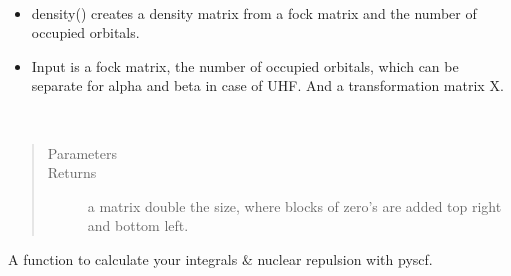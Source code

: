 \documentclass[letterpaper,10pt,english]{sphinxmanual}
\begin{document}
\begin{fulllineitems}
\label{\detokenize{SCF_functions:ghf.SCF_functions.density_matrix}}~\begin{itemize}
\item {} 
density() creates a density matrix from a fock matrix and the number of occupied orbitals.

\item {} 
Input is a fock matrix, the number of occupied orbitals, which can be separate for alpha and beta in case of UHF.
And a transformation matrix X.

\end{itemize}

\end{fulllineitems}


\begin{fulllineitems}
\label{\detokenize{SCF_functions:ghf.SCF_functions.expand_matrix}}~\begin{quote}\begin{description}
\item[{Parameters}] \leavevmode
{} \textendash{} 

\item[{Returns}] \leavevmode
a matrix double the size, where blocks of zero’s are added top right and bottom left.

\end{description}\end{quote}

\end{fulllineitems}


\begin{fulllineitems}
\label{\detokenize{SCF_functions:ghf.SCF_functions.get_integrals}}
A function to calculate your integrals \& nuclear repulsion with pyscf.

\end{fulllineitems}
\end{document}
